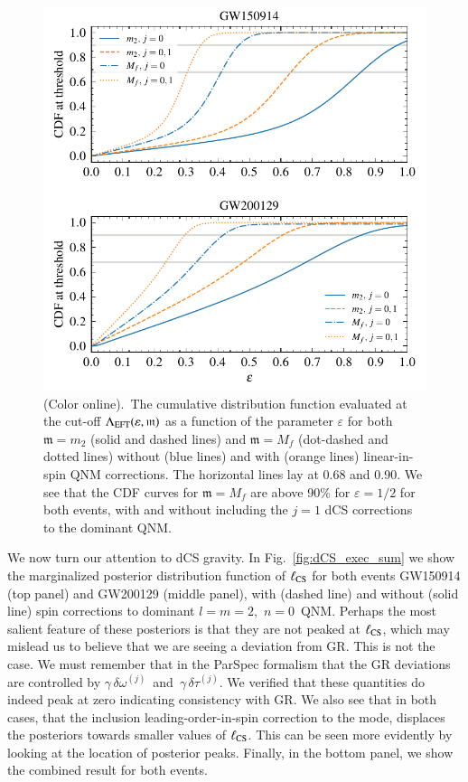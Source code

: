 \documentclass[twocolumn,
               prd,
               aps,
               superscriptaddress,
               tightenlines,
               nofootinbib,
               eqsecnum,
               amsfonts,
               amsmath,
               longbibliography]{revtex4-1}
\newcommand{\gm}{\mathfrak{m}}
\begin{document}
\begin{figure}[t]
\includegraphics[width=\columnwidth]{figs/dcs_cdf_varying_threshold.pdf}
\caption{(Color online).~The cumulative distribution function evaluated at the
cut-off $\Lambda_{\rm EFT}(\varepsilon, \gm)$ as a function of the parameter $\varepsilon$ for both
$\gm = m_2$ (solid and dashed lines) and $\gm = M_{f}$ (dot-dashed and dotted lines) without
(blue lines) and with (orange lines) linear-in-spin QNM corrections.
The horizontal lines lay at 0.68 and 0.90.
%
We see that the CDF curves for $\gm = M_{f}$ are above 90\% for $\varepsilon =
1/2$ for both events, with and without including the $j = 1$ dCS corrections to
the dominant QNM.
}
\label{fig:dcs_cdf}
\end{figure}


We now turn our attention to dCS gravity.
%
In Fig.~\ref{fig:dCS_exec_sum} we show the marginalized posterior distribution
function of $\ell_{\rm CS}$ for both events GW150914 (top panel) and GW200129
(middle panel), with (dashed line) and without (solid line) spin corrections to
dominant $l = m = 2$,~$n=0$~QNM.
%
Perhaps the most salient feature of these posteriors is that they are not
peaked at $\ell_{\rm CS}$, which may mislead us to believe that we are seeing a
deviation from GR. This is not the case.
%
We must remember that in the ParSpec formalism that the GR deviations
are controlled by $\gamma \, \delta \omega^{(j)}$~and~$\gamma \, \delta \tau^{(j)}$.
We verified that these quantities do indeed peak at zero indicating consistency with GR.
%
We also see that in both cases, that the inclusion leading-order-in-spin
correction to the mode, displaces the posteriors towards smaller values of
$\ell_{\rm CS}$. This can be seen more evidently by looking at the location of
posterior peaks.
%
Finally, in the bottom panel, we show the combined result for both events.
\end{document}
